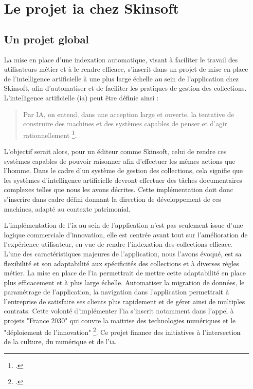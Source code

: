 \section{\label{I_3_C}Le projet \gls{ia} chez Skinsoft} 

\subsection{Un projet global}
La mise en place d'une indexation automatique, visant à faciliter le travail des utilisateurs métier et à le rendre efficace, s'inscrit dans un projet de mise en place de l'intelligence artificielle à une plus large échelle au sein de l'application chez Skinsoft, afin d'automatiser et de faciliter les pratiques de gestion des collections. L'intelligence artificielle (\gls{ia}) peut être définie ainsi : 

\begin{quote} 
	
	Par IA, on entend, dans une acception large et ouverte, la tentative de construire des machines et des systèmes capables de penser et d'agir rationnellement \footcite{zotero-item-584}. 
	
\end{quote} 



L'objectif serait alors, pour un éditeur comme Skinsoft, celui de rendre ces systèmes capables de pouvoir raisonner afin d'effectuer les mêmes actions que l'homme. Dans le cadre d'un système de gestion des collections, cela signifie que les systèmes d'intelligence artificielle devront effectuer des tâches documentaires complexes telles que nous les avons décrites. Cette implémentation doit donc s'inscrire dans cadre défini donnant la direction de développement de ces machines, adapté au contexte patrimonial. 

L'implémentation de l'\gls{ia} au sein de l'application n'est pas seulement issue d'une logique commerciale d'innovation, elle est centrée avant tout sur l'amélioration de l'expérience utilisateur, en vue de rendre l'indexation des collections efficace. L'une des caractéristiques majeures de l'application, nous l'avons évoqué, est sa flexibilité et son adaptabilité aux spécificités des collections et à diverses règles métier. La mise en place de l'\gls{ia} permettrait de mettre cette adaptabilité en place plus efficacement et à plus large échelle. Automatiser la migration de données, le paramétrage de l'application, la navigation dans l'application permettrait à l'entreprise de satisfaire ses clients plus rapidement et de gérer ainsi de multiples contrats. Cette volonté d'implémenter l'\gls{ia} s'inscrit notamment dans l'appel à projets "France 2030" qui couvre la maitrise des technologies numériques et le "déploiement de l'innovation" \footcite{zotero-item-636}. Ce projet finance des initiatives à l'intersection de la culture, du numérique et de l'\gls{ia}. 

